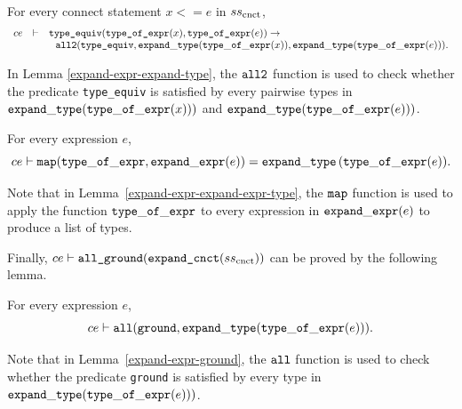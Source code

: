\begin{lemma}\label{expand-expr-expand-type}
For every connect statement $x <= e$ in $ss_{\rm cnct}$, 
$$
\begin{array}{l c l}
ce & \vdash & \mbox{\tt type\_equiv}(\mbox{\tt type\_of\_expr}(x), \mbox{\tt type\_of\_expr}(e)) \rightarrow \\
& & \ \ {\tt all2}(\mbox{\tt type\_equiv},{\tt expand\_type}({\tt type\_of\_expr}(x)),{\tt expand\_type}({\tt type\_of\_expr}(e))).
\end{array}
$$

\end{lemma}
In Lemma \ref{expand-expr-expand-type}, the ${\tt all2}$ function is used to check whether the predicate {\tt type\_equiv} is satisfied by every pairwise types in ${\tt expand\_type}({\tt type\_of\_expr}(x)))$ and ${\tt expand\_type}({\tt type\_of\_expr}(e)))$.

\begin{lemma}\label{expand-expr-expand-expr-type}
For every expression $e$, 
$$ce \vdash {\tt map}({\tt type\_of\_expr}, {\tt expand\_expr}(e)) = {\tt expand\_type}\,({\tt type\_of\_expr}(e)).$$
\end{lemma}
Note that in Lemma~\ref{expand-expr-expand-expr-type}, the ${\tt map}$ function is used to apply the function ${\tt type\_of\_expr}$ to every expression in ${\tt expand\_expr}(e)$ to produce a list of types. 

Finally, $ce \vdash \mbox{\tt all\_ground}(\mbox{\tt expand\_cnct}(ss_{\rm cnct}))$ can be proved by the following lemma. 
\begin{lemma}\label{expand-expr-ground}
For every expression $e$, 
$$ce \vdash {\tt all}({\tt ground}, {\tt expand\_type}({\tt type\_of\_expr}(e))).$$
\end{lemma}
Note that in Lemma~\ref{expand-expr-ground}, the ${\tt all}$ function is used to check whether the predicate {\tt ground} is satisfied by every type in ${\tt expand\_type}({\tt type\_of\_expr}(e)))$.


